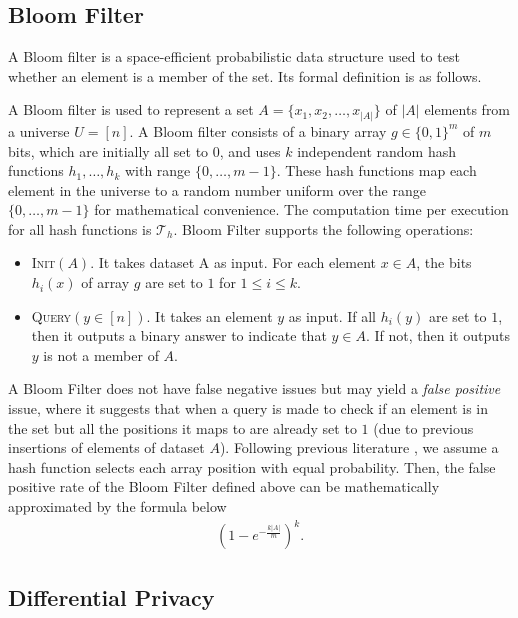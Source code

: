 \subsection{Bloom Filter}\label{sec:pre_def_bf}
A Bloom filter is a space-efficient probabilistic data structure used to test whether an element is a member of the set. Its formal definition is as follows.
\begin{definition}\label{def:bloom_filter}
    A Bloom filter is used to represent a set $A = \{x_1,x_2,\dots,x_{|A|}\}$ of $|A|$ elements from a universe $U = [n]$. A Bloom filter consists of a binary array $g \in \{0,1\}^m$ of $m$ bits, which are initially all set to $0$, and uses $k$ independent random hash functions $h_1,\dots,h_k$ with range $\{0, \dots, m-1\}$. These hash functions map each element in the universe to a random number uniform over the range $\{0,\dots,m-1\}$ for mathematical convenience. The computation time per execution for all hash functions is $\mathcal{T}_h$. Bloom Filter supports the following operations:
    \begin{itemize}
        \item \textsc{Init}$(A)$. It takes dataset A as input. For each element $x \in A$, the bits $h_i(x)$ of array $g$ are set to $1$ for $1\leq i \leq k$.
        \item \textsc{Query}$(y \in [n])$. It takes an element $y$ as input. If all $h_i(y)$ are set to $1$, then it outputs a binary answer to indicate that $y \in A$. If not, then it outputs $y$ is not a member of $A$.
    \end{itemize}
\end{definition}
A Bloom Filter does not have false negative issues but may yield a \textit{false positive} issue, where it suggests that when a query is made to check if an element is in the set but all the positions it maps to are already set to $1$ (due to previous insertions of elements of dataset $A$). Following previous literature \cite{ll23, bcfm98, lk11, loz12}, we assume a hash function selects each array position with equal probability. Then, the false positive rate of the Bloom Filter defined above can be mathematically approximated by the formula below
\begin{align*}
    (1-e^{-\frac{k|A|}{m}})^k.
\end{align*}

\subsection{Differential Privacy}\label{sec:pre_def_dp}

